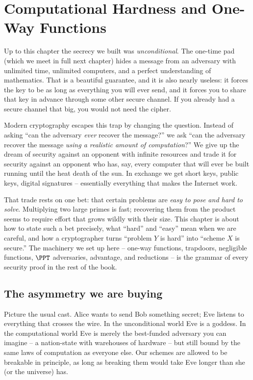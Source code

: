 \chapter{Computational Hardness and One-Way Functions}

Up to this chapter the secrecy we built was \emph{unconditional}. The one-time pad (which we meet in full next chapter) hides a message from an adversary with unlimited time, unlimited computers, and a perfect understanding of mathematics. That is a beautiful guarantee, and it is also nearly useless: it forces the key to be as long as everything you will ever send, and it forces you to share that key in advance through some other secure channel. If you already had a secure channel that big, you would not need the cipher.

Modern cryptography escapes this trap by changing the question. Instead of asking ``can the adversary \emph{ever} recover the message?'' we ask ``can the adversary recover the message \emph{using a realistic amount of computation}?'' We give up the dream of security against an opponent with infinite resources and trade it for security against an opponent who has, say, every computer that will ever be built running until the heat death of the sun. In exchange we get short keys, public keys, digital signatures -- essentially everything that makes the Internet work.

That trade rests on one bet: that certain problems are \emph{easy to pose and hard to solve}. Multiplying two large primes is fast; recovering them from the product seems to require effort that grows wildly with their size. This chapter is about how to state such a bet precisely, what ``hard'' and ``easy'' mean when we are careful, and how a cryptographer turns ``problem $Y$ is hard'' into ``scheme $X$ is secure.'' The machinery we set up here -- one-way functions, trapdoors, negligible functions, $\PPT$ adversaries, advantage, and reductions -- is the grammar of every security proof in the rest of the book.

\chapterline

\section{The asymmetry we are buying}
\label{ch08:asymmetry}

Picture the usual cast. Alice wants to send Bob something secret; Eve listens to everything that crosses the wire. In the unconditional world Eve is a goddess. In the computational world Eve is merely the best-funded adversary you can imagine -- a nation-state with warehouses of hardware -- but still bound by the same laws of computation as everyone else. Our schemes are allowed to be breakable in principle, as long as breaking them would take Eve longer than she (or the universe) has.

